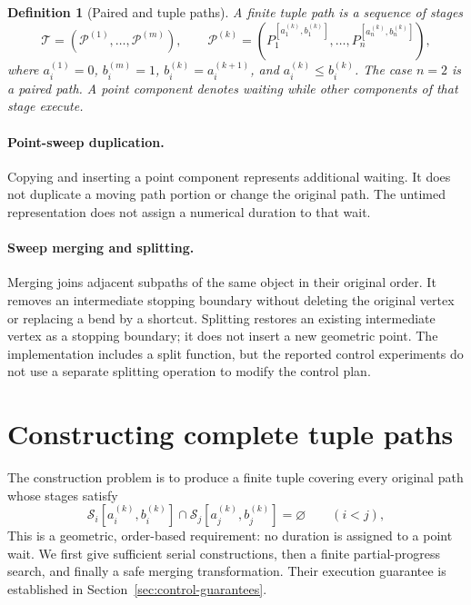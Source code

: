\documentclass[11pt,a4paper]{article}
\newtheorem{definition}{Definition}
\theoremstyle{remark}
\newcommand{\Sw}{\mathcal S}
\begin{document}
\begin{definition}[Paired and tuple paths]
A finite tuple path is a sequence of stages
\begin{equation}
 \mathcal T=(\mathcal P^{(1)},\ldots,\mathcal P^{(m)}),\qquad
 \mathcal P^{(k)}=(P_1^{[a_1^{(k)},b_1^{(k)}]},\ldots,
                    P_n^{[a_n^{(k)},b_n^{(k)}]}),
 \label{eq:tuple}
\end{equation}
where $a_i^{(1)}=0$, $b_i^{(m)}=1$,
$b_i^{(k)}=a_i^{(k+1)}$, and $a_i^{(k)}\le b_i^{(k)}$.
The case $n=2$ is a paired path. A point component denotes waiting while
other components of that stage execute.
\end{definition}

\paragraph{Point-sweep duplication.}
Copying and inserting a point component represents additional waiting. It
does not duplicate a moving path portion or change the original path.
The untimed representation does not assign a numerical duration to that wait.

\paragraph{Sweep merging and splitting.}
Merging joins adjacent subpaths of the same object in their original order.
It removes an intermediate stopping boundary without deleting the original
vertex or replacing a bend by a shortcut. Splitting restores an existing
intermediate vertex as a stopping boundary; it does not insert a new geometric
point. The implementation includes a split function, but the reported control
experiments do not use a separate splitting operation to modify the control plan.

\section{Constructing complete tuple paths}
\label{sec:construction}
The construction problem is to produce a finite tuple covering every
original path whose stages satisfy
\begin{equation}
 \Sw_i[a_i^{(k)},b_i^{(k)}]\cap
 \Sw_j[a_j^{(k)},b_j^{(k)}]=\varnothing\qquad(i<j),
 \label{eq:stage-safe}
\end{equation}
This is a geometric, order-based requirement: no duration is assigned to a
point wait. We first give sufficient serial constructions, then a finite
partial-progress search, and finally a safe merging transformation. Their
execution guarantee is established in Section~\ref{sec:control-guarantees}.
\end{document}
